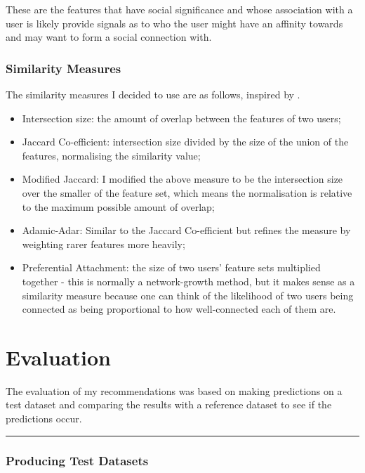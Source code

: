 \documentclass[a4paper,12pt,twoside,notitlepage]{report}
\newcommand{\rulewidth}{300pt}
\newcommand{\halfrule}{
  \begin{center}
    {\rule{\rulewidth}{0.5pt}}
  \end{center}}
\begin{document}
These are the features that have social significance and whose association with
a user is likely provide signals as to who the user might have an affinity
towards and may want to form a social connection with.

\subsection{Similarity Measures}

The similarity measures I decided to use are as follows,
inspired by \cite{link-prediction}.

\begin{itemize}
 \item Intersection size: the amount of overlap between the features of two
users;
 \item Jaccard Co-efficient: intersection size divided by the size of the union
of the features, normalising the similarity value;
 \item Modified Jaccard: I modified the above measure to be the intersection
size over the smaller of the feature set, which means the normalisation is
relative to the maximum possible amount of overlap;
 \item Adamic-Adar\cite{adamic-adar}: Similar to the Jaccard Co-efficient but
refines the measure by weighting rarer features more heavily;
 \item Preferential Attachment: the size of two users' feature sets multiplied
together - this is normally a network-growth method, but it makes sense as a
similarity measure because one can think of the likelihood of two users being
connected as being proportional to how well-connected each of them are.
\end{itemize}


\chapter{Evaluation}

The evaluation of my recommendations was based on making predictions on a test
dataset and comparing the results with a reference dataset to see if the
predictions occur.

\halfrule

\subsection{Producing Test Datasets}
\end{document}
